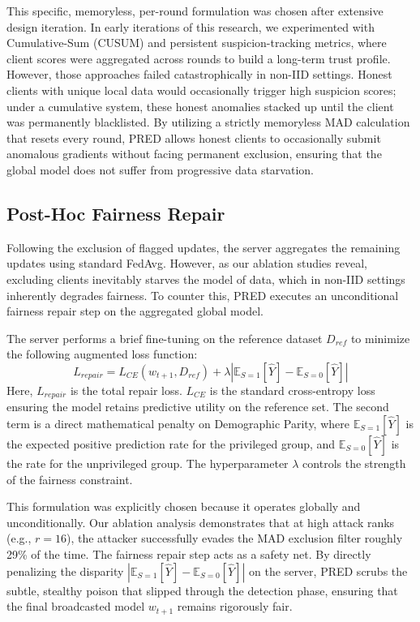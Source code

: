 \documentclass[journal]{IEEEtran}
\begin{document}
This specific, memoryless, per-round formulation was chosen after extensive design iteration. In early iterations of this research, we experimented with Cumulative-Sum (CUSUM) and persistent suspicion-tracking metrics, where client scores were aggregated across rounds to build a long-term trust profile. However, those approaches failed catastrophically in non-IID settings. Honest clients with unique local data would occasionally trigger high suspicion scores; under a cumulative system, these honest anomalies stacked up until the client was permanently blacklisted. By utilizing a strictly memoryless MAD calculation that resets every round, PRED allows honest clients to occasionally submit anomalous gradients without facing permanent exclusion, ensuring that the global model does not suffer from progressive data starvation.

\subsection{Post-Hoc Fairness Repair}
Following the exclusion of flagged updates, the server aggregates the remaining updates using standard FedAvg. However, as our ablation studies reveal, excluding clients inevitably starves the model of data, which in non-IID settings inherently degrades fairness. To counter this, PRED executes an unconditional fairness repair step on the aggregated global model.

The server performs a brief fine-tuning on the reference dataset $D_{ref}$ to minimize the following augmented loss function:
\begin{equation}
L_{repair} = L_{CE}(w_{t+1}, D_{ref}) + \lambda \left| \mathbb{E}_{S=1}[\hat{Y}] - \mathbb{E}_{S=0}[\hat{Y}] \right|
\end{equation}
Here, $L_{repair}$ is the total repair loss. $L_{CE}$ is the standard cross-entropy loss ensuring the model retains predictive utility on the reference set. The second term is a direct mathematical penalty on Demographic Parity, where $\mathbb{E}_{S=1}[\hat{Y}]$ is the expected positive prediction rate for the privileged group, and $\mathbb{E}_{S=0}[\hat{Y}]$ is the rate for the unprivileged group. The hyperparameter $\lambda$ controls the strength of the fairness constraint.

This formulation was explicitly chosen because it operates globally and unconditionally. Our ablation analysis demonstrates that at high attack ranks (e.g., $r=16$), the attacker successfully evades the MAD exclusion filter roughly 29\% of the time. The fairness repair step acts as a safety net. By directly penalizing the disparity $|\mathbb{E}_{S=1}[\hat{Y}] - \mathbb{E}_{S=0}[\hat{Y}]|$ on the server, PRED scrubs the subtle, stealthy poison that slipped through the detection phase, ensuring that the final broadcasted model $w_{t+1}$ remains rigorously fair.
\end{document}
